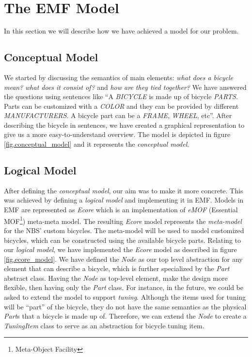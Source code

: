 \section{The EMF Model}
\label{sec.logical_model}
In this section we will describe how we have achieved a model for our problem.

\subsection{Conceptual Model}
\noindent We started by discussing the semantics of main elements: \emph{what
does a bicycle mean?} \emph{what does it consist of?} and \emph{how are they
tied together?} We have answered the questions using sentences like ``A
\emph{BICYCLE} is made up of bicycle \emph{PARTS}. Parts can be customized with
a \emph{COLOR} and they can be provided by different \emph{MANUFACTURERS}.
A bicycle part can be a \emph{FRAME}, \emph{WHEEL}, etc''. After describing the
bicycle in sentences, we have created a graphical representation to give us a
more easy-to-understand overview. The model is depicted in figure
\ref{fig.conceptual_model} and it represents the \emph{conceptual model}.

\subsection{Logical Model}
\noindent After defining the \emph{conceptual model}, our aim was to make it
more concrete. This was achieved by defining a \emph{logical model} and
implementing it in EMF. Models in EMF are represented as \emph{Ecore} which is 
an implementation of \emph{eMOF} (Essential MOF\footnote{Meta-Object Facility}) meta-meta model. The resulting \emph{Ecore} model represents the \emph{meta-model} for
the NBS' custom bicycles. The meta-model will be used to model customized bicycles, which can be constructed using the
available bicycle parts. Relating to our \emph{logical model}, we have
implemented the \emph{Ecore} model as described in figure \ref{fig.ecore_model}.
We have defined the \emph{Node} as our top level abstraction for any element
that can describe a bicycle, which is further specialized by the \emph{Part}
abstract class. Having the \emph{Node} as top-level element, make the design
more flexible, then having only the \emph{Part} class. For instance,  in the
future, we could be asked to extend the model to support \emph{tuning}. Although
the items used for tuning will be ``part'' of the bicycle, they do not have the
same semantics as the physical \emph{Part}s that a bicycle is made up of.
Therefore, we can extend the \emph{Node} to create a \emph{TuningItem} class to
serve as an abstraction for bicycle tuning item.\\

